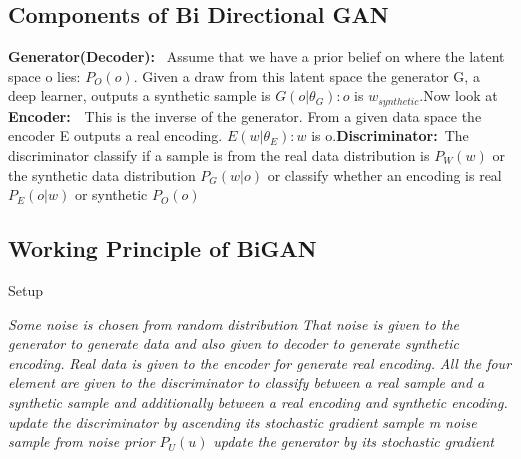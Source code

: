 \documentclass[runningheads]{llncs}
\begin{document}
{\newline
\hfill \break
\subsection{Components of Bi Directional GAN}
\textbf{Generator(Decoder):}~ Assume that we have a prior belief on where the latent space o lies: $P_{O}(o)$. Given a draw from this latent space the generator G, a deep learner, outputs a synthetic sample is $ {G(o|\theta_G):o}$ is $w_{synthetic}$.Now look at 
\textbf{Encoder:}~~This is the inverse of the generator. From a given data space the encoder E outputs a real encoding. $E(w|\theta_E):w$  is o.\textbf{Discriminator:}~The discriminator classify if a sample is from the real data distribution is ${P_W(w)}$ or the synthetic data distribution $P_G(w|o)$ or classify whether an encoding is real $ P_E(o|w)$  or synthetic $P_O(o) $

\subsection{Working Principle of BiGAN}
\begin{algorithm*}[H]
\caption{Setup}
\label{algo:pre}
\begin{algorithmic}[1]
    
            \STATE \emph{Some noise is chosen from random distribution}
            \STATE \emph{That noise is given to the generator to generate data
 and also given to decoder to generate synthetic encoding.}
            \STATE \emph{Real data is given to the encoder for generate real encoding.}
            \STATE \emph{All the four element are given to the discriminator to classify between a real sample and a synthetic sample and additionally between a real encoding and synthetic encoding.
 }
            \STATE \emph{update the discriminator by ascending its stochastic gradient}
        \ENDFOR
        \STATE \emph{sample m noise sample from noise prior ${P_U(u)}$}
        \STATE \emph{update the generator by its stochastic gradient}
    \ENDFOR
    

\end{algorithmic}
\end{algorithm*}}
\end{document}
